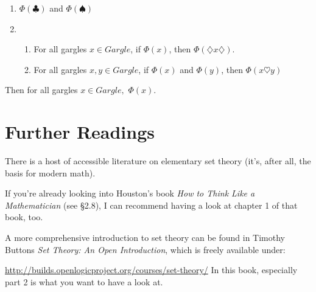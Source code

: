 \begin{enumerate}[\thesection.1]
\begin{theorem}
\begin{enumerate}
				\item $\Phi(\clubsuit)$ and $\Phi(\spadesuit)$
				
				\item \begin{enumerate}\item For all gargles $x\in Gargle$, if $\Phi(x)$, then $\Phi(\diamondsuit x\diamondsuit)$.
			
					\item  For all gargles $x,y\in Gargle$, if $\Phi(x)$ and $\Phi(y)$, then $\Phi(x\heartsuit y)$
					
					\end{enumerate}
			\end{enumerate}
			Then for all gargles $x\in Gargle,$ $\Phi(x)$.
			\end{theorem}
	
	\end{enumerate}

\section{Further Readings}

There is a host of accessible literature on elementary set theory (it's, after all, the basis for modern math). 

If you're already looking into Houston's book \emph{How to Think Like a Mathematician} (see \S2.8), I can recommend having a look at chapter 1 of that book, too.

A more comprehensive introduction to set theory can be found in Timothy Buttons \emph{Set Theory: An Open Introduction}, which is freely available under:

	\url{http://builds.openlogicproject.org/courses/set-theory/}
In this book, especially part 2 is what you want to have a look at.

\vfill

